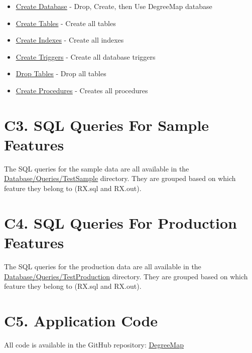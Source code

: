\documentclass[12pt, a4paper]{article}
\begin{document}
\begin{itemize}
    \item \underline{\href{https://github.com/Kggupta/DegreeMap/blob/main/Database/Queries/CreateDatabase.sql}{Create Database}} - Drop, Create, then Use DegreeMap database
    \item \underline{\href{https://github.com/Kggupta/DegreeMap/blob/main/Database/Queries/CreateTables.sql}{Create Tables}} - Create all tables
    \item \underline{\href{https://github.com/Kggupta/DegreeMap/blob/main/Database/Queries/CreateIndexes.sql}{Create Indexes}} - Create all indexes

    \item \underline{\href{https://github.com/Kggupta/DegreeMap/blob/main/Database/Queries/CreateTriggers.sql}{Create Triggers}} - Create all database triggers
    \item \underline{\href{https://github.com/Kggupta/DegreeMap/blob/main/Database/Queries/DropTables.sql}{Drop Tables}} - Drop all tables
    \item \underline{\href{https://github.com/Kggupta/DegreeMap/blob/main/Database/Queries/Procedures.sql}{Create Procedures}} - Creates all procedures
\end{itemize}
\section*{C3. SQL Queries For Sample Features}
The SQL queries for the sample data are all available in the \underline{\href{https://github.com/Kggupta/DegreeMap/tree/main/Database/Queries/TestSample}{Database/Queries/TestSample}} directory. They are grouped based on which feature they belong to (RX.sql and RX.out).
\section*{C4. SQL Queries For Production Features}
The SQL queries for the production data are all available in the \underline{\href{https://github.com/Kggupta/DegreeMap/tree/main/Database/Queries/TestProduction}{Database/Queries/TestProduction}} directory. They are grouped based on which feature they belong to (RX.sql and RX.out).
\section*{C5. Application Code}
All code is available in the GitHub repository: \underline{\href{https://github.com/Kggupta/DegreeMap}{DegreeMap}}
\end{document}
